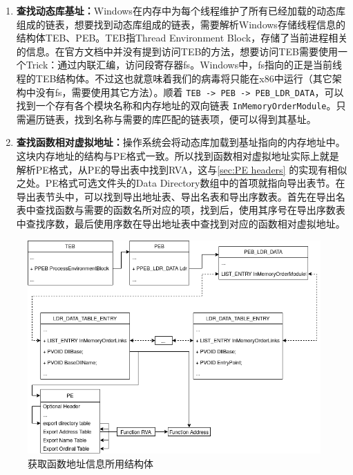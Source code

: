 \documentclass[UTF8]{ctexart}
\begin{document}
    \begin{enumerate}
        \item \textbf{查找动态库基址：}Windows在内存中为每个线程维护了所有已经加载的动态库组成的链表，想要找到动态库组成的链表，需要解析Windows存储线程信息的结构体TEB、PEB。TEB指Thread Environment Block，存储了当前进程相关的信息。在官方文档中并没有提到访问TEB的方法，想要访问TEB需要使用一个Trick：通过内联汇编，访问段寄存器fs。Windows中，fs指向的正是当前线程的TEB结构体。不过这也就意味着我们的病毒将只能在x86中运行（其它架构中没有fs，需要使用其它方法）。顺着 \lstinline{TEB -> PEB -> PEB_LDR_DATA}，可以找到一个存有各个模块名称和内存地址的双向链表 \lstinline{InMemoryOrderModule}。只需遍历链表，找到名称与需要的库匹配的链表项，便可以得到其基址。
    
        \item \textbf{查找函数相对虚拟地址：}操作系统会将动态库加载到基址指向的内存地址中。这块内存地址的结构与PE格式一致。所以找到函数相对虚拟地址实际上就是解析PE格式，从PE的导出表中找到RVA，这与\ref{sec:PE headers} 的实现有相似之处。PE格式可选文件头的Data Directory数组中的首项就指向导出表节。在导出表节头中，可以找到导出地址表、导出名表和导出序数表。首先在导出名表中查找函数与需要的函数名所对应的项，找到后，使用其序号在导出序数表中查找序数，最后使用序数在导出地址表中查找到对应的函数相对虚拟地址。
    \end{enumerate}
    
    \begin{figure}[h]
        \centering
        \includegraphics[width=\linewidth]{.asset/FindFunc.png}
        \caption{获取函数地址信息所用结构体}
        \label{fig:FindFunc}
    \end{figure}
    
\end{document}
